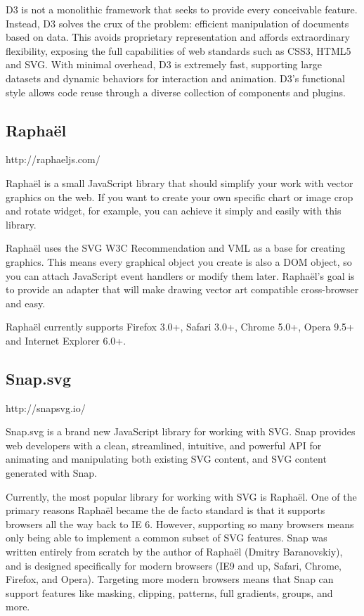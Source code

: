 D3 is not a monolithic framework that seeks to provide every conceivable feature. Instead, D3 solves the crux of the problem: efficient manipulation of documents based on data. This avoids proprietary representation and affords extraordinary flexibility, exposing the full capabilities of web standards such as CSS3, HTML5 and SVG. With minimal overhead, D3 is extremely fast, supporting large datasets and dynamic behaviors for interaction and animation. D3’s functional style allows code reuse through a diverse collection of components and plugins. 

\subsection{Raphaël}
http://raphaeljs.com/

Raphaël is a small JavaScript library that should simplify your work with vector graphics on the web. If you want to create your own specific chart or image crop and rotate widget, for example, you can achieve it simply and easily with this library.

Raphaël  uses the SVG W3C Recommendation and VML as a base for creating graphics. This means every graphical object you create is also a DOM object, so you can attach JavaScript event handlers or modify them later. Raphaël’s goal is to provide an adapter that will make drawing vector art compatible cross-browser and easy.

Raphaël currently supports Firefox 3.0+, Safari 3.0+, Chrome 5.0+, Opera 9.5+ and Internet Explorer 6.0+. 


\subsection{Snap.svg }

http://snapsvg.io/

Snap.svg is a brand new JavaScript library for working with SVG. Snap provides web developers with a clean, streamlined, intuitive, and powerful API for animating and manipulating both existing SVG content, and SVG content generated with Snap.

Currently, the most popular library for working with SVG is Raphaël. One of the primary reasons Raphaël became the de facto standard is that it supports browsers all the way back to IE 6. However, supporting so many browsers means only being able to implement a common subset of SVG features. Snap was written entirely from scratch by the author of Raphaël (Dmitry Baranovskiy), and is designed specifically for modern browsers (IE9 and up, Safari, Chrome, Firefox, and Opera). Targeting more modern browsers means that Snap can support features like masking, clipping, patterns, full gradients, groups, and more.

